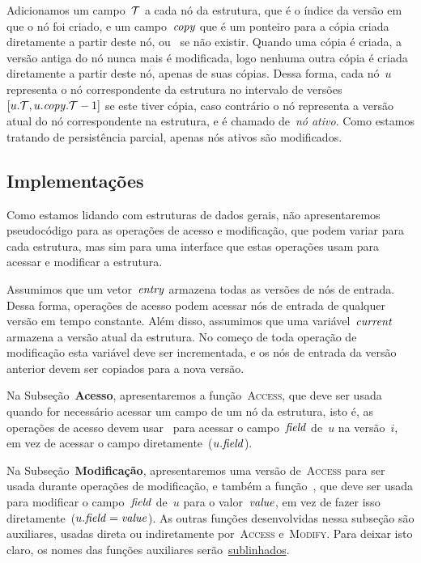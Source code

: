 \documentclass[../../main.tex]{subfiles}
\begin{document}
Adicionamos um campo~$\mathcal{T}$ a cada nó da estrutura, que é o índice da versão em que o nó foi criado, e um campo~$\mathit{copy}$ que é um ponteiro para a cópia criada diretamente a partir deste nó, ou~ se não existir. Quando uma cópia é criada, a versão antiga do nó nunca mais é modificada, logo nenhuma outra cópia é criada diretamente a partir deste nó, apenas de suas cópias. Dessa forma, cada nó~$u$ representa o nó correspondente da estrutura no intervalo de versões~${[u.\mathcal{T}, u.\mathit{copy}.\mathcal{T} - 1]}$ se este tiver cópia, caso contrário o nó representa a versão atual do nó correspondente na estrutura, e é chamado de~\emph{nó ativo}. Como estamos tratando de persistência parcial, apenas nós ativos são modificados.

\subsection{Implementações}

Como estamos lidando com estruturas de dados gerais, não apresentaremos pseudocódigo para as operações de acesso e modificação, que podem variar para cada estrutura, mas sim para uma interface que estas operações usam para acessar e modificar a estrutura.

\newcommand{\cur}{\V{current}}
Assumimos que um vetor~$\mathit{entry}$ armazena todas as versões de nós de entrada. Dessa forma, operações de acesso podem acessar nós de entrada de qualquer versão em tempo constante. Além disso, assumimos que uma variável~$\cur$ armazena a versão atual da estrutura. No começo de toda operação de modificação esta variável deve ser incrementada, e os nós de entrada da versão anterior devem ser copiados para a nova versão.

Na Subseção~\textbf{Acesso}, apresentaremos a função~\textsc{Access}, que deve ser usada quando for necessário acessar um campo de um nó da estrutura, isto é, as operações de acesso devem usar~\mbox{} para acessar o campo~$\mathit{field}$ de~$u$ na versão~$i$, em vez de acessar o campo diretamente~($u.\mathit{field}$).

\newcommand{\auxfunc}[1]{\underline{#1}}

Na Subseção~\textbf{Modificação}, apresentaremos uma versão de~\textsc{Access} para ser usada durante operações de modificação, e também a função~, que deve ser usada para modificar o campo~$\mathit{field}$ de~$u$ para o valor~$\mathit{value}$, em vez de fazer isso diretamente~($u.\mathit{field} = \mathit{value}$). As outras funções desenvolvidas nessa subseção são auxiliares, usadas direta ou indiretamente por~\mbox{\textsc{Access}} e~\textsc{Modify}. Para deixar isto claro, os nomes das funções auxiliares serão~\auxfunc{sublinhados}. %
\end{document}
